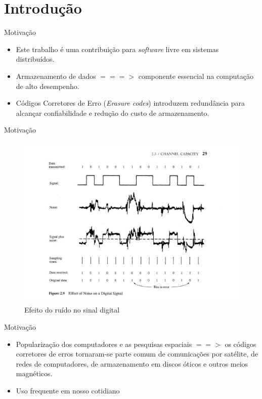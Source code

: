  \section{Introdução}

  \begin{frame}{Motivação}
     \begin{itemize}
      \item Este trabalho é uma contribuição para \emph{software} livre em sistemas distribuídos.
      \item Armazenamento de dados $===>$ componente essencial na computação de alto desempenho. 
      \item Códigos Corretores de Erro (\emph{Erasure codes}) introduzem redundância para alcançar confiabilidade e redução do custo de armazenamento.    
     \end{itemize}
  \end{frame}

  \begin{frame}{Motivação}
   \begin{figure}[h]
     \centering
     \includegraphics[scale=.25]{stalling-channel-capacity.jpg}
     \caption{Efeito do ruído no sinal digital \cite{Stallings:2005}}
     \label{fig1:ersd}
   \end{figure}
  \end{frame}

  \begin{frame}{Motivação}
     \begin{itemize}
         \item Popularização dos computadores e as pesquisas espaciais $==>$ os códigos corretores de erros tornaram-se parte comum de comunicações por satélite, de redes de computadores, de armazenamento em discos óticos e outros meios magnéticos.
         \item Uso frequente em nosso cotidiano
     \end{itemize}
  \end{frame}

